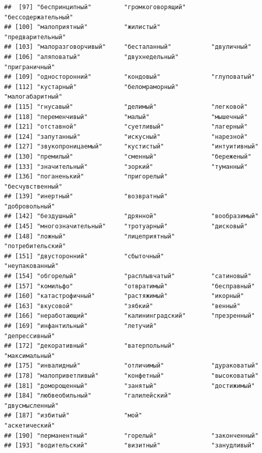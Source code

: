 \documentclass[11pt]{article}\usepackage[]{graphicx}\usepackage[]{color}
\makeatletter
\newenvironment{kframe}{%
 \def\at@end@of@kframe{}%
 \ifinner\ifhmode%
  \def\at@end@of@kframe{\end{minipage}}%
  \begin{minipage}{\columnwidth}%
 \fi\fi%
 \def\FrameCommand##1{\hskip\@totalleftmargin \hskip-\fboxsep
 \colorbox{shadecolor}{##1}\hskip-\fboxsep
     \hskip-\linewidth \hskip-\@totalleftmargin \hskip\columnwidth}%
 \MakeFramed {\advance\hsize-\width
   \@totalleftmargin\z@ \linewidth\hsize
   \@setminipage}}%
 {\par\unskip\endMakeFramed%
 \at@end@of@kframe}
\newenvironment{knitrout}{}{} %
\makeatother
\begin{document}
\begin{knitrout}
\begin{kframe}
\begin{verbatim}
##  [97] "беспринципный"         "громкоговорящий"       "бессодержательный"    
## [100] "малоприятный"          "жилистый"              "предварительный"      
## [103] "малоразговорчивый"     "бесталанный"           "двуличный"            
## [106] "аляповатый"            "двухнедельный"         "приграничный"         
## [109] "односторонний"         "кондовый"              "глуповатый"           
## [112] "кустарный"             "беломраморный"         "малогабаритный"       
## [115] "гнусавый"              "делимый"               "легковой"             
## [118] "переменчивый"          "малый"                 "мышечный"             
## [121] "отставной"             "суетливый"             "лагерный"             
## [124] "запутанный"            "искусный"              "нарезной"             
## [127] "звукопроницаемый"      "кустистый"             "интуитивный"          
## [130] "премилый"              "сменный"               "береженый"            
## [133] "значительный"          "зоркий"                "туманный"             
## [136] "поганенький"           "пригорелый"            "бесчувственный"       
## [139] "инертный"              "возвратный"            "добровольный"         
## [142] "бездушный"             "дрянной"               "вообразимый"          
## [145] "многозначительный"     "тротуарный"            "дисковый"             
## [148] "ложный"                "лицеприятный"          "потребительский"      
## [151] "двусторонний"          "сбыточный"             "неупакованный"        
## [154] "обгорелый"             "расплывчатый"          "сатиновый"            
## [157] "комильфо"              "отвратимый"            "бесправный"           
## [160] "катастрофичный"        "растяжимый"            "икорный"              
## [163] "вкусовой"              "зябкий"                "венный"               
## [166] "неработающий"          "калининградский"       "презренный"           
## [169] "инфантильный"          "летучий"               "депрессивный"         
## [172] "декоративный"          "ватерпольный"          "максимальный"         
## [175] "инвалидный"            "отличимый"             "дураковатый"          
## [178] "малоприветливый"       "конфетный"             "высоковатый"          
## [181] "доморощенный"          "занятый"               "достижимый"           
## [184] "любвеобильный"         "галилейский"           "двусмысленный"        
## [187] "избитый"               "мой"                   "аскетический"         
## [190] "перманентный"          "горелый"               "законченный"          
## [193] "водительский"          "визитный"              "занудливый"           

\end{verbatim}
\end{kframe}
\end{knitrout}
\end{document}
